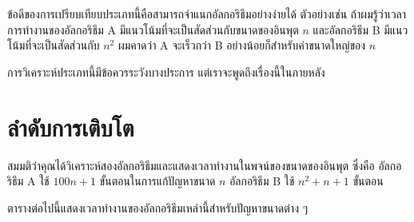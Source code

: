 
ข้อดีของการเปรียบเทียบประเภทนี้คือสามารถจำแนกอัลกอริธึมอย่างง่ายได้ ตัวอย่างเช่น 
ถ้าผมรู้ว่าเวลาการทำงานของอัลกอริธึม A มีแนวโน้มที่จะเป็นสัดส่วนกับขนาดของอินพุต {\scriptsize$n$}
และอัลกอริธึม B มีแนวโน้มที่จะเป็นสัดส่วนกับ {\scriptsize$n^2$} ผมคาดว่า A จะเร็วกว่า B อย่างน้อยก็สำหรับค่าขนาดใหญ่ของ {\scriptsize$n$}


การวิเคราะห์ประเภทนี้มีข้อควรระวังบางประการ แต่เราจะพูดถึงเรื่องนี้ในภายหลัง


\section{ลำดับการเติบโต } %


สมมติว่าคุณได้วิเคราะห์สองอัลกอริธึมและแสดงเวลาทำงานในพจน์ของขนาดของอินพุต
ซึ่งคือ
อัลกอริธึม A ใช้ {\scriptsize$100n+1$} ขั้นตอนในการแก้ปัญหาขนาด {\scriptsize$n$} 
อัลกอริธึม B ใช้ {\scriptsize$n^2 + n + 1$} ขั้นตอน

ตารางต่อไปนี้แสดงเวลาทำงานของอัลกอริธึมเหล่านี้สำหรับปัญหาขนาดต่าง ๆ


